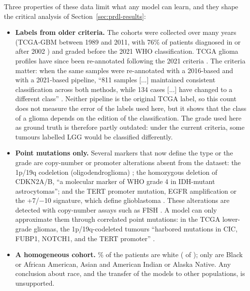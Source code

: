 Three properties of these data limit what any model can learn, and they shape the critical analysis
of Section~\ref{sec:prdl-results}:
\begin{itemize}
  \item \textbf{Labels from older criteria.} The cohorts were collected over many years
        (TCGA-GBM between 1989 and 2011, with 76\% of patients diagnosed in or after 2002
        \cite{zakharova2023}) and graded before the 2021 WHO classification. TCGA glioma profiles
        have since been re-annotated following the 2021 criteria \cite{zakharova2023,leiriademendonca2025}.
        The criteria matter: when the same samples were re-annotated with a 2016-based and with a
        2021-based pipeline, ``811 samples [...] maintained consistent classification across both
        methods, while 134 cases [...] have changed to a different class'' \cite{leiriademendonca2025}.
        Neither pipeline is the original TCGA label, so this count does not measure the error of the
        labels used here, but it shows that the class of a glioma depends on the edition of the
        classification. The grade used here as ground truth is therefore partly outdated: under the current criteria,
        some tumours labelled LGG would be classified differently.
  \item \textbf{Point mutations only.} Several markers that now define the type or the grade are
        copy-number or promoter alterations absent from the dataset: the 1p/19q codeletion
        (oligodendroglioma) \cite{louis2021}; the homozygous deletion of CDKN2A/B, ``a molecular marker
        of WHO grade 4 in IDH-mutant astrocytomas''; and the TERT promoter mutation, EGFR amplification
        or the +7/$-$10 signature, which define glioblastoma \cite{weller2021}. These alterations are
        detected with copy-number assays such as FISH \cite{sahm2023}. A model can only approximate them
        through correlated point mutations: in the TCGA lower-grade gliomas, the 1p/19q-codeleted tumours
        ``harbored mutations in CIC, FUBP1, NOTCH1, and the TERT promoter'' \cite{tcga2015lgg}.
  \item \textbf{A homogeneous cohort.} \PctWhite\% of the patients are white (\NWhite{} of
        \NClean); only \NBlack{} are Black or African American, \NAsian{} Asian and \NNative{}
        American Indian or Alaska Native. Any conclusion about race, and the transfer of the models
        to other populations, is unsupported.
\end{itemize}

